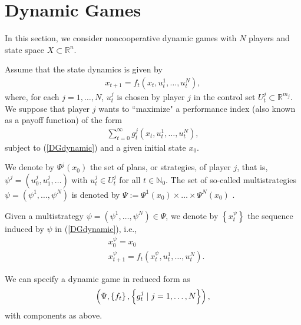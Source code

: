 \documentclass[3p]{elsarticle}
\newcommand{\rzn}{\mathbb R^{n}}
\newcommand{\nat}{\mathbb N_0}
\begin{document}
	
	
	
	
	
	
	
	
	\section{Dynamic Games}
	
	In this section, we consider noncooperative dynamic games with $N$ players and state space $X\subset\rzn$. 
	
	
	
	
	
	
	
	
	
	Assume that the state dynamics is given by 
	\begin{align}\label{DGdynamic}
	x_{t+1}=f_t(x_t,u_t^{1},\dots,u_t^N),
	\end{align}
	where, for each $j=1,\dots, N$, $u_t^j$  is chosen by player $j$ in the control set $U_t^j\subset\mathbb R^{m_j}$. We suppose that player $j$ wants to ``maximize" a performance index (also known as a payoff function) of the form
	\begin{align}\label{DGPI}
	\sum_{t=0}^{\infty}g_t^j(x_t,u_t^1,\dots,u_t^N),
	\end{align}
	subject to (\ref{DGdynamic}) and a given initial state $x_0$.
	
	We denote by $\Psi^j(x_0)$ the set of plans, or strategies, of player $j$, that is,  $\psi^j=(u_0^j,u_1^j,\dots)$ with $u_t^j\in U_t^j$ for all $t\in\nat$. The set of so-called multistrategies $\psi=(\psi^1,\dots,\psi^N)$ is denoted by $\Psi:=\Psi^1(x_0)\times\dots\times\Psi^N(x_0)$ .
	
	
	Given a multistrategy  $\psi=(\psi^1,\dots,\psi^N)\in\Psi$, we denote by $\left\lbrace x_t^\psi \right\rbrace $ the sequence induced by $\psi$ in (\ref{DGdynamic}), i.e., 
	\begin{align*}
	&x_0^\psi=x_0\\
	&x_{t+1}^\psi=f_t(x_t^\psi,u_t^{1},\dots,u_t^N).
	\end{align*}
	
	
	
	
	
	We can specify a dynamic game in reduced form as 
	\begin{align}\label{DGtuple}
	\left(\Psi,\left\lbrace f_t\right\rbrace ,\left\lbrace g_t^j\hspace{0.1cm}|\hspace{0.1cm} j=1,\dots,N\right\rbrace\right),
	\end{align} 
	with components as above. 
	
\end{document}
